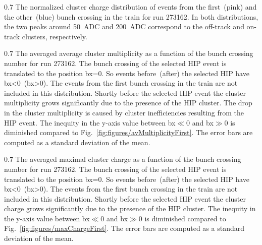                  {0.7}       %
                 {The normalized cluster charge distribution of events from the first~(pink) and the other~(blue) bunch crossing in the train for run 273162. In both distributions, the two peaks around 50~ADC and 200~ADC correspond to the off-track and on-track clusters, respectively. } %


                 {0.7}       %
                 {The averaged average cluster multiplicity as a function of the bunch crossing number for run 273162. The bunch crossing of the selected HIP event is translated to the position bx=0. So events before~(after) the selected HIP have bx<0~(bx>0). The events from the first bunch crossing in the train are not included in this distribution. Shortly before the selected HIP event the cluster multiplicity grows significantly due to the presence of the HIP cluster.  The drop in the cluster multiplicity is caused by cluster inefficiencies resulting from the HIP event. The inequity in the y-axis value between bx$\ll$0 and bx$\gg$0 is diminished compared to Fig.~\ref{fig:figures/avMultiplicityFirst}. The error bars are computed as a standard deviation of the mean. } %

                 {0.7}       %
                 {The averaged maximal cluster charge as a function of the bunch crossing number for run 273162. The bunch crossing of the selected HIP event is translated to the position bx=0. So events before~(after) the selected HIP have bx<0~(bx>0). The events from the first bunch crossing in the train are not included in this distribution. Shortly before the selected HIP event the cluster charge grows significantly due to the presence of the HIP cluster. The inequity in the y-axis value between bx$\ll$0 and bx$\gg$0 is diminished compared to Fig.~\ref{fig:figures/maxChargeFirst}. The error bars are computed as a standard deviation of the mean. } %

